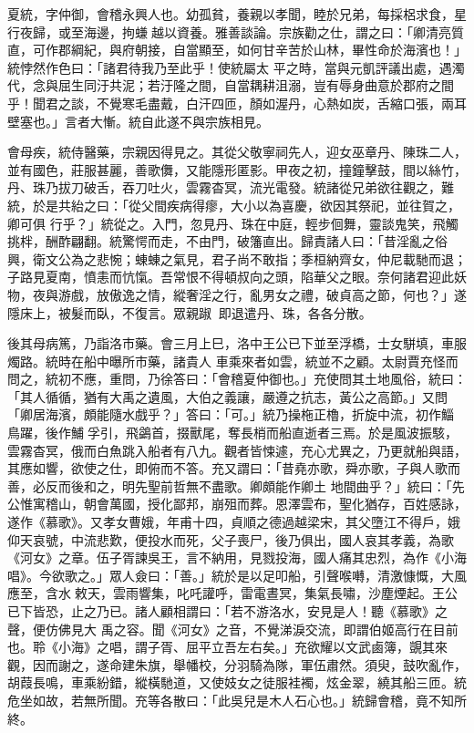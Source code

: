 \begin{pinyinscope}
 夏統，字仲御，會稽永興人也。幼孤貧，養親以孝聞，睦於兄弟，每採梠求食，星行夜歸，或至海邊，拘螊越以資養。雅善談論。宗族勸之仕，謂之曰：「卿清亮質直，可作郡綱紀，與府朝接，自當顯至，如何甘辛苦於山林，畢性命於海濱也！」統悖然作色曰：「諸君待我乃至此乎！使統屬太
 平之時，當與元凱評議出處，遇濁代，念與屈生同汙共泥；若汙隆之間，自當耦耕沮溺，豈有辱身曲意於郡府之間乎！聞君之談，不覺寒毛盡戴，白汗四匝，顏如渥丹，心熱如炭，舌縮口張，兩耳壁塞也。」言者大慚。統自此遂不與宗族相見。



 會母疾，統侍醫藥，宗親因得見之。其從父敬寧祠先人，迎女巫章丹、陳珠二人，並有國色，莊服甚麗，善歌儛，又能隱形匿影。甲夜之初，撞鐘擊鼓，間以絲竹，丹、珠乃拔刀破舌，吞刀吐火，雲霧杳冥，流光電發。統諸從兄弟欲往觀之，難統，於是共紿之曰：「從父間疾病得瘳，大小以為喜慶，欲因其祭祀，並往賀之，卿可俱
 行乎？」統從之。入門，忽見丹、珠在中庭，輕步佪舞，靈談鬼笑，飛觸挑柈，酬酢翩翻。統驚愕而走，不由門，破籓直出。歸責諸人曰：「昔淫亂之俗興，衛文公為之悲惋；蝀蝀之氣見，君子尚不敢指；季桓納齊女，仲尼載馳而退；子路見夏南，憤恚而忼愾。吾常恨不得頓叔向之頭，陷華父之眼。奈何諸君迎此妖物，夜與游戲，放傲逸之情，縱奢淫之行，亂男女之禮，破貞高之節，何也？」遂隱床上，被髮而臥，不復言。眾親踧，即退遣丹、珠，各各分散。



 後其母病篤，乃詣洛市藥。會三月上巳，洛中王公已下並至浮橋，士女駢填，車服燭路。統時在船中曝所市藥，諸貴人
 車乘來者如雲，統並不之顧。太尉賈充怪而問之，統初不應，重問，乃徐答曰：「會稽夏仲御也。」充使問其土地風俗，統曰：「其人循循，猶有大禹之遺風，大伯之義讓，嚴遵之抗志，黃公之高節。」又問「卿居海濱，頗能隨水戲乎？」答曰：「可。」統乃操柂正櫓，折旋中流，初作鯔鳥躍，後作鯆孚引，飛鷁首，掇獸尾，奪長梢而船直逝者三焉。於是風波振駭，雲霧杳冥，俄而白魚跳入船者有八九。觀者皆悚遽，充心尤異之，乃更就船與語，其應如響，欲使之仕，即俯而不答。充又謂曰：「昔堯亦歌，舜亦歌，子與人歌而善，必反而後和之，明先聖前哲無不盡歌。卿頗能作卿土
 地間曲乎？」統曰：「先公惟寓稽山，朝會萬國，授化鄙邦，崩殂而葬。恩澤雲布，聖化猶存，百姓感詠，遂作《慕歌》。又孝女曹娥，年甫十四，貞順之德過越梁宋，其父墮江不得戶，娥仰天哀號，中流悲歎，便投水而死，父子喪尸，後乃俱出，國人哀其孝義，為歌《河女》之章。伍子胥諫吳王，言不納用，見戮投海，國人痛其忠烈，為作《小海唱》。今欲歌之。」眾人僉曰：「善。」統於是以足叩船，引聲喉囀，清激慷慨，大風應至，含水敕天，雲雨響集，叱吒讙呼，雷電晝冥，集氣長嘯，沙塵煙起。王公已下皆恐，止之乃已。諸人顧相謂曰：「若不游洛水，安見是人！聽《慕歌》之聲，便仿佛見大
 禹之容。聞《河女》之音，不覺涕淚交流，即謂伯姬高行在目前也。聆《小海》之唱，謂子胥、屈平立吾左右矣。」充欲耀以文武鹵簿，覬其來觀，因而謝之，遂命建朱旗，舉幡校，分羽騎為隊，軍伍肅然。須臾，鼓吹亂作，胡葭長鳴，車乘紛錯，縱橫馳道，又使妓女之徒服袿襡，炫金翠，繞其船三匝。統危坐如故，若無所聞。充等各散曰：「此吳兒是木人石心也。」統歸會稽，竟不知所終。




\end{pinyinscope}
